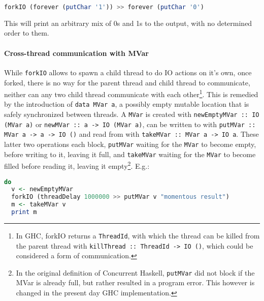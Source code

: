 \documentclass[a4paper,UKenglish,cleveref, autoref, thm-restate]{lipics-v2021}
\begin{document}
\begin{minipage}{\linewidth}
\begin{lstlisting}[language=Haskell,caption={Two threads running forever in parallel},captionpos=t]
forkIO (forever (putChar '1')) >> forever (putChar '0')
\end{lstlisting}
\end{minipage}

This will print an arbitrary mix of 0s and 1s to the output, with no determined order to them.

\paragraph*{Cross-thread communication with MVar}

While \lstinline{forkIO} allows to spawn a child thread to do IO actions on it's own, once forked, there is no way for the parent thread and child thread to communicate, neither can any two child thread communicate with each other\footnote{In GHC, forkIO returns a \lstinline{ThreadId}, with which the thread can be killed from the parent thread with \lstinline{killThread :: ThreadId -> IO ()}, which could be considered a form of communication.}. This is remedied by the introduction of \lstinline{data MVar a}, a possibly empty mutable location that is safely synchronized between threads\cite{jones1996concurrent}. A \lstinline{MVar} is created with \lstinline{newEmptyMVar :: IO (MVar a)} or \lstinline{newMVar :: a -> IO (MVar a)}, can be written to with \lstinline{putMVar :: MVar a -> a -> IO ()} and read from with \lstinline{takeMVar :: MVar a -> IO a}\cite{jones1996concurrent}. These latter two operations each block, \lstinline{putMVar} waiting for the \lstinline{MVar} to become empty, before writing to it, leaving it full, and \lstinline{takeMVar} waiting for the \lstinline{MVar} to become filled before reading it, leaving it empty\footnote{In the original definition of Concurrent Haskell, \lstinline{putMVar} did not block if the MVar is already full, but rather resulted in a program error. This however is changed in the present day GHC implementation.\cite{jones2001monadic}}. E.g.:

\begin{minipage}{\linewidth}
\begin{lstlisting}[language=Haskell,caption={Using an MVar to hand a result back to the parent thread},captionpos=t]
do
  v <- newEmptyMVar
  forkIO (threadDelay 1000000 >> putMVar v "momentous result")
  m <- takeMVar v
  print m
\end{lstlisting}
\end{minipage}
\end{document}
